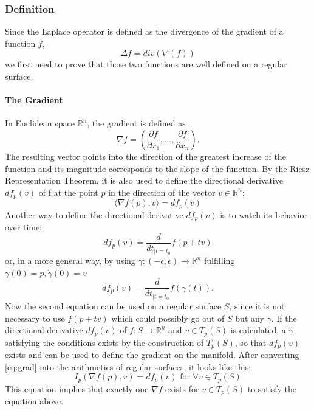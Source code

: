 \subsubsection{Definition}
Since the Laplace operator is defined as the divergence of the gradient of a function $f$,
$$\Delta f = div(\nabla(f))$$
we first need to prove that those two functions are well defined on a regular surface.

\paragraph{The Gradient}
In Euclidean space $\mathbb{R}^n$, the gradient is defined as
$$\nabla f = \left(\frac{\partial f}{\partial x_{1}}, \dots, \frac{\partial f}{\partial x_{n}}\right).$$
The resulting vector points into the direction of the greatest increase of the function and its magnitude corresponds to the slope of the function.
By the Riesz Representation Theorem, it is also used to define the directional derivative $d f_{p}(v)$ of f at the point $p$ in the direction of the vector $v \in \mathbb{R}^n$:
\begin{equation}
	\langle \nabla f(p), v \rangle = d f_{p}(v)
	\label{eq:grad}
\end{equation}
Another way to define the directional derivative $d f_p(v)$ is to watch its behavior over time:
\begin{equation*}
	d f_p(v) = \frac{d}{dt_{|t=t_0}} f(p + tv)
\end{equation*}
or, in a more general way, by using $\gamma : (-\epsilon, \epsilon) \rightarrow \mathbb{R}^n$ fulfilling $\gamma(0) = p, \dot{\gamma}(0) = v$
\begin{equation*}
	d f_p(v) = \frac{d}{dt_{|t=t_0}} f(\gamma(t)).
\end{equation*}
Now the second equation can be used on a regular surface $S$, since it is not necessary to use $f(p+tv)$ which could possibly go out of $S$ but any $\gamma$.
If the directional derivative $df_p(v)$ of $f: S \rightarrow \mathbb{R}^n$ and $v \in T_p(S)$ is calculated, a $\gamma$ satisfying the conditions exists by the construction of $T_p(S)$, so that $df_p(v)$ exists and can be used to define the gradient on the manifold.
After converting \eqref{eq:grad} into the arithmetics of regular surfaces, it looks like this:
\begin{equation*}
	I_p(\nabla f(p),v) = d f_p(v) \mbox{ for } \forall v \in T_p(S)
\end{equation*}
This equation implies that exactly one $\nabla f$ exists for $v \in T_p(S)$ to satisfy the equation above.

